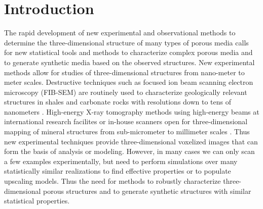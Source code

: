 \documentclass[aps,pre,twocolumn,letterpaper,floatfix,showpacs]{revtex4}
\begin{document}
\section{Introduction}

The rapid development of new experimental and observational methods to determine the three-dimensional
structure of many types of porous media calls for new statistical tools and methods to characterize
complex porous media and to generate synthetic media based on the observed structures.
New experimental methods allow for studies of three-dimensional structures from nano-meter to meter scales.
Destructive techniques such as focused ion beam scanning electron microscopy (FIB-SEM) are routinely
used to characterize geologically relevant structures in shales and carbonate rocks with resolutions
down to tens of nanometers \cite{cnudde2013high,curtis2010structural}.
High-energy X-ray tomography methods using high-energy beams at international research facilites or
in-house scanners open for three-dimensional mapping of mineral structures from sub-micrometer to
millimeter scales \cite{kobchenko20114d,jamtveit2014pore,zhu2011microtomography,fusseis2009creep}.
Thus new experimental techniques provide three-dimensional voxelized images that can form the basis
of analysis or modeling.
However, in many cases we can only scan a few examples experimentally, but need to perform simulations
over many statistically similar realizations to find effective properties or to populate upscaling models.
Thus the need for methods to robustly characterize three-dimensional porous structures and to generate
synthetic structures with similar statistical properties. 
\end{document}
